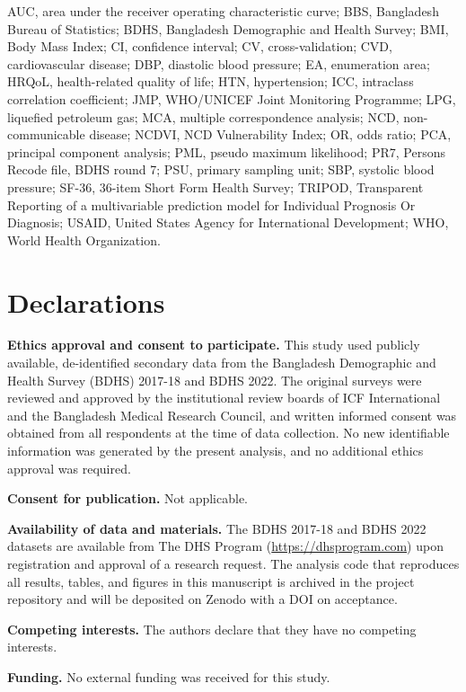 \documentclass[
  12pt,
  a4paper]{article}
\begin{document}
AUC, area under the receiver operating characteristic curve; BBS, Bangladesh Bureau of Statistics; BDHS, Bangladesh Demographic and Health Survey; BMI, Body Mass Index; CI, confidence interval; CV, cross-validation; CVD, cardiovascular disease; DBP, diastolic blood pressure; EA, enumeration area; HRQoL, health-related quality of life; HTN, hypertension; ICC, intraclass correlation coefficient; JMP, WHO/UNICEF Joint Monitoring Programme; LPG, liquefied petroleum gas; MCA, multiple correspondence analysis; NCD, non-communicable disease; NCDVI, NCD Vulnerability Index; OR, odds ratio; PCA, principal component analysis; PML, pseudo maximum likelihood; PR7, Persons Recode file, BDHS round 7; PSU, primary sampling unit; SBP, systolic blood pressure; SF-36, 36-item Short Form Health Survey; TRIPOD, Transparent Reporting of a multivariable prediction model for Individual Prognosis Or Diagnosis; USAID, United States Agency for International Development; WHO, World Health Organization.

\section*{Declarations}\label{declarations}

\textbf{Ethics approval and consent to participate.} This study used publicly available, de-identified secondary data from the Bangladesh Demographic and Health Survey (BDHS) 2017-18 and BDHS 2022. The original surveys were reviewed and approved by the institutional review boards of ICF International and the Bangladesh Medical Research Council, and written informed consent was obtained from all respondents at the time of data collection. No new identifiable information was generated by the present analysis, and no additional ethics approval was required.

\textbf{Consent for publication.} Not applicable.

\textbf{Availability of data and materials.} The BDHS 2017-18 and BDHS 2022 datasets are available from The DHS Program (\url{https://dhsprogram.com}) upon registration and approval of a research request. The analysis code that reproduces all results, tables, and figures in this manuscript is archived in the project repository and will be deposited on Zenodo with a DOI on acceptance.

\textbf{Competing interests.} The authors declare that they have no competing interests.

\textbf{Funding.} No external funding was received for this study.
\end{document}
